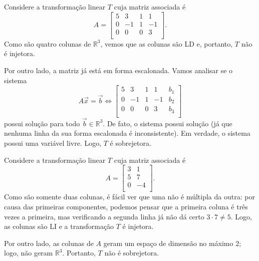 \documentclass[../livro.tex]{subfiles}
\begin{document}
\begin{example}\label{exp:injsob1}
Considere a transformação linear $T$ cuja matriz associada é
\begin{equation}
A = \left[
  \begin{array}{rrrr}
    5  & 3 & 1 & 1 \\
    0  & -1 & 1 & -1 \\
    0  & 0 & 0 & 3 \\
  \end{array}
\right].
\end{equation} Como são quatro colunas de $\mathbb{R}^3$, vemos que as colunas são LD e, portanto, $T$ não é injetora.

Por outro lado, a matriz já está em forma escalonada. Vamos analisar se o sistema
\begin{equation}
A \vec{x} = \vec{b} \iff
\left[
  \begin{array}{rrrr|r}
    5  & 3 & 1 & 1 & b_1\\
    0  & -1 & 1 & -1& b_2\\
    0  & 0 & 0 & 3& b_3\\
  \end{array}
\right]
\end{equation} possui solução para todo $\vec{b} \in \mathbb{R}^3$. De fato, o sistema possui solução (já que nenhuma linha da sua forma escalonada é inconsistente). Em verdade, o sistema possui uma variável livre. Logo, $T$ é sobrejetora.
\end{example}


\begin{example}\label{exp:injsob2}
Considere a transformação linear $T$ cuja matriz associada é
\begin{equation}
A = \left[
  \begin{array}{rrrr}
    3  & 1 \\
    5  & 7 \\
    0  & -4 \\
  \end{array}
\right].
\end{equation} Como são somente duas colunas, é fácil ver que uma não é múltipla da outra: por causa das primeiras componentes, podemos pensar que a primeira coluna é três vezes a primeira, mas verificando a segunda linha já não dá certo $3\cdot 7 \neq 5$. Logo, as colunas são LI e a transformação $T$ é injetora.

Por outro lado,  as colunas de $A$ geram um espaço de dimensão no máximo 2; logo, não geram $\mathbb{R}^3$. Portanto, $T$ não é sobrejetora.
\end{example}
\end{document}
